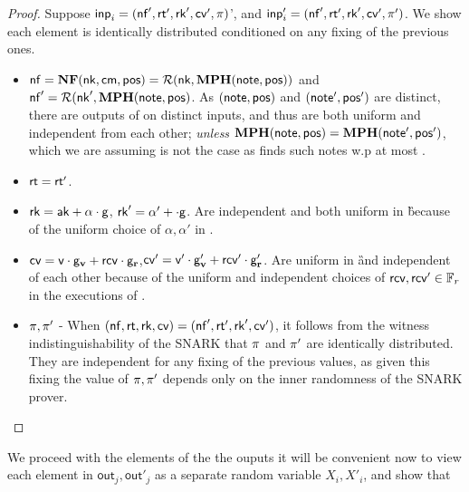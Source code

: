 \documentclass[11pt]{article}
\numberwithin{equation}{section} %
\numberwithin{figure}{section} %
\newcommand{\inp}{\ensuremath{\mathsf{inp}}\xspace}
\newcommand{\out}{\ensuremath{\mathsf{out}}\xspace}
\begin{document}
\begin{proof}
 Suppose $\inp_i=(\nf',\rt',\rk',\cv',\prf)$', and $\inp'_i=(\nf',\rt',\rk',\cv',\prf')$.
 We show each element is identically distributed conditioned on any fixing of the previous ones.
 \begin{itemize}
  \item  $\mathsf{nf} = \mathbf{NF}(\mathsf{nk},\mathsf{cm},\mathsf{pos})=\mathcal R(\mathsf{nk},\mathbf{MPH}(\mathsf{note},\mathsf{pos}))$ and $\mathsf{nf}'=\mathcal R(\mathsf{nk}',\mathbf{MPH}(\mathsf{note},\mathsf{pos})$. As $(\mathsf{note},\mathsf{pos})$ and $(\mathsf{note}',\mathsf{pos}')$ are distinct, there are outputs of \RO on distinct inputs, and thus are both uniform and independent from each other; \emph{unless} $\mathbf{MPH}(\mathsf{note},\mathsf{pos}) = \mathbf{MPH}(\mathsf{note}',\mathsf{pos}')$, which we are assuming is not the case as \adv finds such notes w.p at most \negl.
  \item $\mathsf{rt}=\mathsf{rt}'$.
  \item $\mathsf{rk}=\mathsf{ak} + \alpha\cdot \mathsf{g}$, $\mathsf{rk}' = \alpha' + \cdot \mathsf{g}$. Are independent and both uniform in \G because of the uniform choice of $\alpha,\alpha'$ in \makerandomizedtx.
  \item $\mathsf{cv}=\mathsf{v}\cdot \mathsf{g}_{\mathbf{v}} + \mathsf{rcv}\cdot \mathsf{g}_\mathbf{r}$,$\mathsf{cv}'=\mathsf{v}'\cdot \mathsf{g}_{\mathbf{v}}' + \mathsf{rcv}'\cdot \mathsf{g}_\mathbf{r}'$. Are uniform in \G and independent of each other because of the uniform and independent choices of $\mathsf{rcv},\mathsf{rcv}'\in {\mathbb F}_r$ in the executions of \makerandomizedtx.
  \item $\pi,\pi'$ - When  $(\mathsf{nf},\mathsf{rt},\mathsf{rk},\mathsf{cv})=(\mathsf{nf}',\mathsf{rt}',\mathsf{rk}',\mathsf{cv}')$, it follows from the witness indistinguishability of the SNARK
  that $\pi$ and $\pi'$ are identically distributed. They are independent for any fixing of the previous values, as given this fixing the value
  of $\pi,\pi'$ depends only on the inner randomness of the SNARK prover.
 \end{itemize}
 
\end{proof} 
\newcommand{\primeof}[1]{\ensuremath{#1 '}\xspace} 
\newcommand{\beforeout}[1]{\ensuremath{D^{\mathsf{out}}_{<#1}}\xspace}
\newcommand{\beforeoutprime}[1]{\ensuremath{D'^{\mathsf{out}}_{<#1}}\xspace}
\newcommand{\beforein}[1]{\ensuremath{D_{<#1}}\xspace}
\newcommand{\beforeinprime}[1]{\ensuremath{D'_{<#1}}\xspace}
We proceed with the elements of the the ouputs it will be convenient now to view each element in $\out_j,\out'_j$ as a
separate random variable $X_i,X'_i$, and show that 
 
\end{document}
